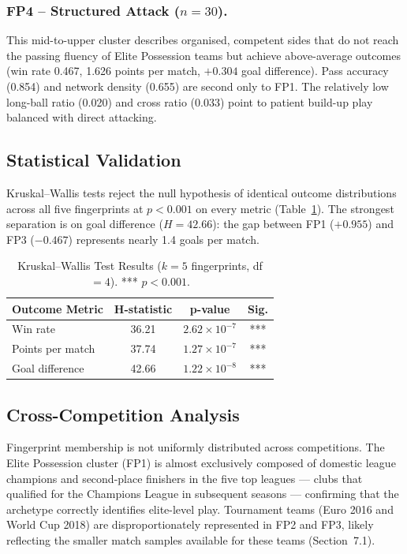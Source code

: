 \documentclass[runningheads]{llncs}
\begin{document}
\subsubsection{FP4 -- Structured Attack ($n = 30$).}
This mid-to-upper cluster describes organised, competent sides that do not reach the passing fluency of Elite Possession teams but achieve above-average outcomes (win rate 0.467, 1.626 points per match, $+0.304$ goal difference). Pass accuracy (0.854) and network density (0.655) are second only to FP1. The relatively low long-ball ratio (0.020) and cross ratio (0.033) point to patient build-up play balanced with direct attacking.

\subsection{Statistical Validation}

Kruskal--Wallis tests reject the null hypothesis of identical outcome distributions across all five fingerprints at $p < 0.001$ on every metric (Table~\ref{tab:kruskal}). The strongest separation is on goal difference ($H = 42.66$): the gap between FP1 ($+0.955$) and FP3 ($-0.467$) represents nearly 1.4 goals per match.

\begin{table}[t]
\caption{Kruskal--Wallis Test Results ($k = 5$ fingerprints, df $= 4$). *** $p < 0.001$.}\label{tab:kruskal}
\centering
\begin{tabular}{|l|c|c|c|}
\hline
\textbf{Outcome Metric} & \textbf{H-statistic} & \textbf{p-value} & \textbf{Sig.} \\
\hline
Win rate         & 36.21 & $2.62 \times 10^{-7}$ & *** \\
Points per match & 37.74 & $1.27 \times 10^{-7}$ & *** \\
Goal difference  & 42.66 & $1.22 \times 10^{-8}$ & *** \\
\hline
\end{tabular}
\end{table}

\subsection{Cross-Competition Analysis}

Fingerprint membership is not uniformly distributed across competitions. The Elite Possession cluster (FP1) is almost exclusively composed of domestic league champions and second-place finishers in the five top leagues --- clubs that qualified for the Champions League in subsequent seasons --- confirming that the archetype correctly identifies elite-level play. Tournament teams (Euro 2016 and World Cup 2018) are disproportionately represented in FP2 and FP3, likely reflecting the smaller match samples available for these teams (Section~7.1).
\end{document}
